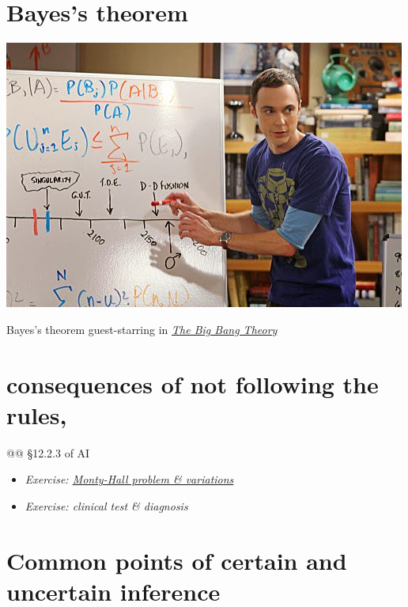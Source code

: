 \documentclass[
  a4paper,
  DIV=11,
  numbers=noendperiod,
  oneside]{scrreprt}
\begin{document}
\hypertarget{bayess-theorem}{%
\section{Bayes's theorem}\label{bayess-theorem}}

\begin{marginfigure}

{\centering \includegraphics{bayes_big-bang.jpg}

}

\caption{Bayes's theorem guest-starring in
\href{https://www.imdb.com/title/tt0898266/}{\emph{The Big Bang
Theory}}}

\end{marginfigure}

\hypertarget{consequences-of-not-following-the-rules}{%
\section{consequences of not following the
rules,}\label{consequences-of-not-following-the-rules}}

@@ §12.2.3 of AI

\begin{itemize}
\item
  \emph{Exercise: \href{The_Monty_Hall_problem-exercise.pdf}{Monty-Hall
  problem \& variations}}
\item
  \emph{Exercise: clinical test \& diagnosis}
\end{itemize}

\hypertarget{common-points-of-certain-and-uncertain-inference}{%
\section{Common points of certain and uncertain
inference}\label{common-points-of-certain-and-uncertain-inference}}
\end{document}
